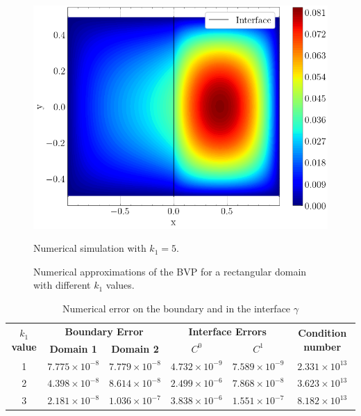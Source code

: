 \begin{figure}[!htb]
    \vspace{0.5cm} %
    
    \begin{minipage}{.6\textwidth}
      \centering
      \includegraphics[width=0.9\linewidth]{Images/Transmission/Rectangle_contour_600_150_k1_5.png}
      \caption{Numerical simulation with  \(k_1=5\).}
      \label{transmission_rectangle_plot_k1_5}
    \end{minipage}
    
    \caption*{Numerical approximations of the \ac{BVP} for a rectangular domain with different \(k_1\) values.}
    \label{transmission_rectangle_plots}
\end{figure}

\begin{table}[htbp]
    \centering
    \begin{tabular}{cccccc}
      \toprule
      \multirow{2}{*}{\textbf{\(k_1\) value}} & \multicolumn{2}{c}{\textbf{Boundary Error}} & \multicolumn{2}{c}{\textbf{Interface Errors}} & \multirow{2}{*}{\textbf{Condition number}} \\
      \cmidrule(lr){2-3} \cmidrule(lr){4-5}
      & \textbf{Domain 1} & \textbf{Domain 2} & \textbf{\(C^0\)} & \textbf{\(C^1\)} & \\
      \midrule
      1 & $7.775\times10^{-8}$ & $7.779\times10^{-8}$ & $4.732\times10^{-9}$ & $7.589\times10^{-9}$ & $2.331\times 10^{13}$\\
      2 & $4.398\times10^{-8}$ & $8.614\times10^{-8}$ & $2.499\times10^{-6}$ & $7.868\times10^{-8}$ & $3.623\times 10^{13}$\\
      3 & $2.181\times10^{-8}$ & $1.036\times10^{-7}$ & $3.838\times10^{-6}$ & $1.551\times10^{-7}$ & $8.182\times 10^{13}$\\
      \bottomrule
    \end{tabular}
    \caption{Numerical error on the boundary and in the interface \(\gamma\)}
    \label{tab:transmission_results_rectangle}
\end{table}

